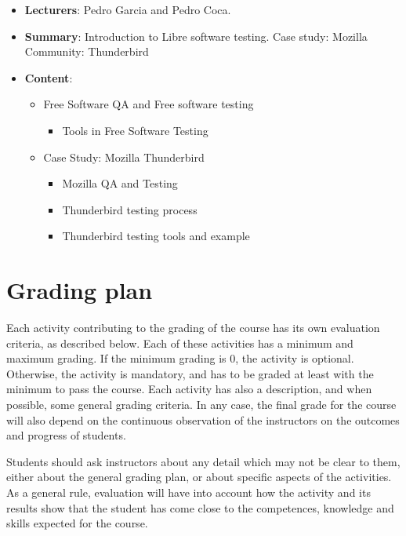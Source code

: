 \documentclass[a4paper]{article}
\begin{document}
\begin{itemize}
 \item \textbf{Lecturers}: Pedro Garcia and Pedro Coca.
 \item \textbf{Summary}: Introduction to Libre software testing. Case study: Mozilla Community: Thunderbird
 \item \textbf{Content}:

    \begin{itemize}

     \item Free Software QA and Free software testing

      \begin{itemize}
       \item Tools in Free Software Testing
      \end{itemize}

     \item Case Study: Mozilla Thunderbird

        \begin{itemize}
         \item Mozilla QA and Testing
         \item Thunderbird testing process
         \item Thunderbird testing tools and example
        \end{itemize}

    \end{itemize}
   

\end{itemize}

\section{Grading plan}

Each activity contributing to the grading of the course has its own evaluation criteria, 
as described below. Each of these activities has a minimum and maximum grading. If the 
minimum grading is 0, the activity is optional. Otherwise, the activity is mandatory, 
and has to be graded at least with the minimum to pass the course. Each activity has 
also a description, and when possible, some general grading criteria. In any case, 
the final grade for the course will also depend on the continuous observation of the 
instructors on the outcomes and progress of students.

Students should ask instructors about any detail which may not be clear to them, either 
about the general grading plan, or about specific aspects of the activities. As a general
 rule, evaluation will have into account how the activity and its results show that the 
student has come close to the competences, knowledge and skills expected for the course.
\end{document}
